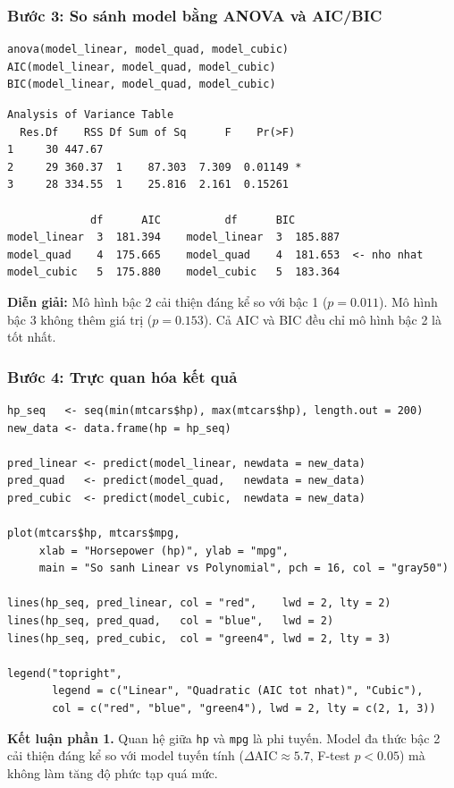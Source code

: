 \subsubsection*{Bước 3: So sánh model bằng ANOVA và AIC/BIC}

\begin{lstlisting}[style=Rstyle]
anova(model_linear, model_quad, model_cubic)
AIC(model_linear, model_quad, model_cubic)
BIC(model_linear, model_quad, model_cubic)
\end{lstlisting}

\begin{lstlisting}[style=output]
Analysis of Variance Table
  Res.Df    RSS Df Sum of Sq      F    Pr(>F)
1     30 447.67
2     29 360.37  1    87.303  7.309  0.01149 *
3     28 334.55  1    25.816  2.161  0.15261

             df      AIC          df      BIC
model_linear  3  181.394    model_linear  3  185.887
model_quad    4  175.665    model_quad    4  181.653  <- nho nhat
model_cubic   5  175.880    model_cubic   5  183.364
\end{lstlisting}

\textbf{Diễn giải:} Mô hình bậc 2 cải thiện đáng kể so với bậc 1 ($p=0.011$). Mô hình bậc 3 không thêm giá trị ($p=0.153$). Cả AIC và BIC đều chỉ mô hình bậc 2 là tốt nhất.

\subsubsection*{Bước 4: Trực quan hóa kết quả}

\begin{lstlisting}[style=Rstyle]
hp_seq   <- seq(min(mtcars$hp), max(mtcars$hp), length.out = 200)
new_data <- data.frame(hp = hp_seq)

pred_linear <- predict(model_linear, newdata = new_data)
pred_quad   <- predict(model_quad,   newdata = new_data)
pred_cubic  <- predict(model_cubic,  newdata = new_data)

plot(mtcars$hp, mtcars$mpg,
     xlab = "Horsepower (hp)", ylab = "mpg",
     main = "So sanh Linear vs Polynomial", pch = 16, col = "gray50")

lines(hp_seq, pred_linear, col = "red",    lwd = 2, lty = 2)
lines(hp_seq, pred_quad,   col = "blue",   lwd = 2)
lines(hp_seq, pred_cubic,  col = "green4", lwd = 2, lty = 3)

legend("topright",
       legend = c("Linear", "Quadratic (AIC tot nhat)", "Cubic"),
       col = c("red", "blue", "green4"), lwd = 2, lty = c(2, 1, 3))
\end{lstlisting}

\textbf{Kết luận phần 1.} Quan hệ giữa \texttt{hp} và \texttt{mpg} là phi tuyến. Model đa thức bậc 2 cải thiện đáng kể so với model tuyến tính ($\Delta\text{AIC} \approx 5.7$, F-test $p < 0.05$) mà không làm tăng độ phức tạp quá mức.

